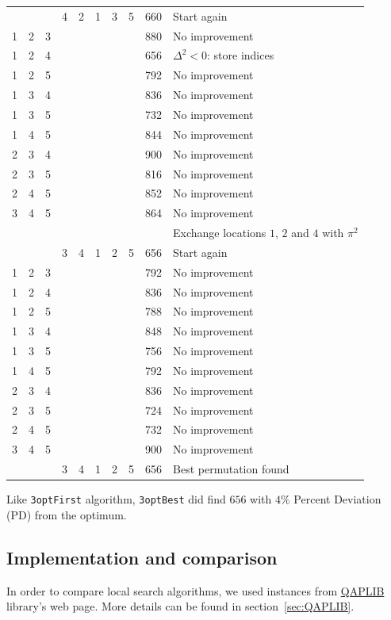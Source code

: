 \begin{table}
\begin{tabular}{*{8}{S[table-format =1.0]}S[table-format =3.0]l}
& & &4 &2 &1 &3 &5 &  660 &Start again\\
1 & 2 & 3 & & & & & &  880 &No improvement\\
1 & 2 & 4 & & & & & &  656 &$\Delta^2< 0$: store indices \\
1 & 2 & 5 & & & & & &  792 &No improvement\\
1 & 3 & 4 & & & & & &  836 &No improvement\\
1 & 3 & 5 & & & & & &  732 &No improvement\\
1 & 4 & 5 & & & & & &  844 &No improvement\\
2 & 3 & 4 & & & & & &  900 &No improvement\\
2 & 3 & 5 & & & & & &  816 &No improvement\\
2 & 4 & 5 & & & & & &  852 &No improvement\\
3 & 4 & 5 & & & & & &  864 &No improvement\\
& & & & & & & &   &Exchange locations $1$, $2$ and $4$ with $\pi^2$ \\
& & &3 &4 &1 &2 &5 &  656 &Start again\\
1 & 2 & 3 & & & & & &  792 &No improvement\\
1 & 2 & 4 & & & & & &  836 &No improvement\\
1 & 2 & 5 & & & & & &  788 &No improvement\\
1 & 3 & 4 & & & & & &  848 &No improvement\\
1 & 3 & 5 & & & & & &  756 &No improvement\\
1 & 4 & 5 & & & & & &  792 &No improvement\\
2 & 3 & 4 & & & & & &  836 &No improvement\\
2 & 3 & 5 & & & & & &  724 &No improvement\\
2 & 4 & 5 & & & & & &  732 &No improvement\\
3 & 4 & 5 & & & & & &  900 &No improvement\\
\midrule
& & &3 &4 &1 &2 &5 &  656 &Best permutation found\\
		\bottomrule
	\end{tabular}

\end{table}
Like \texttt{3optFirst} algorithm, \texttt{3optBest} did find $656$ with $4\%$ Percent Deviation (PD) from the optimum.

\afterpage{\clearpage}

\subsection{Implementation and comparison}
\label{sec:r-ottimi}
In order to compare local search algorithms, we used instances from  \href{http://anjos.mgi.polymtl.ca/qaplib/inst.html}{QAPLIB}~\cite{QAPLIB} library's web page. More details can be found in section~\ref{sec:QAPLIB}.

